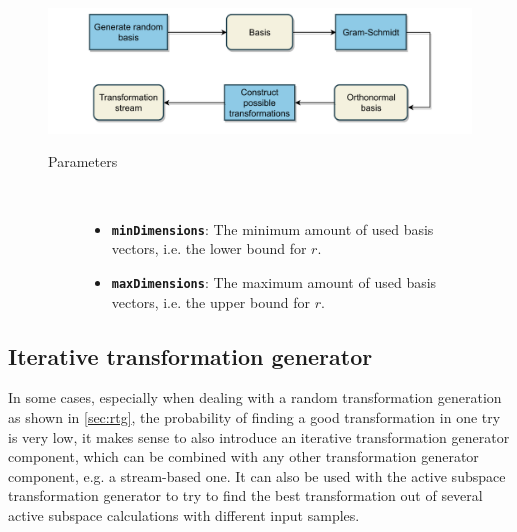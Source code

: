 \documentclass[
  a4paper,  %
  twoside,  %
  bibliography=totoc,
  headsepline,
  cleardoublepage=empty,
  parskip=half,
  draft=false
]{scrbook}
\begin{document}
\begin{mdframed}[style=style,frametitle={Transformation stream generator (random)}]
\begin{figure}[H]

\vspace{5px}
\includegraphics[width=\textwidth]{graphics/TransformationStreamGen_Random.pdf}

\delimit
\begin{description}
\item[Parameters] {~ \begin{itemize}[\indent{}]
\item \texttt{\textbf{minDimensions}}: The minimum amount of used basis vectors, i.e. the lower bound for $r$.
\item \texttt{\textbf{maxDimensions}}: The maximum amount of used basis vectors, i.e. the upper bound for $r$.
\end{itemize}}
\end{description}
\delimit
{}
\label{fig:rtsg}
\end{figure}
\end{mdframed}

\newpage

\subsection {Iterative transformation generator}

In some cases, especially when dealing with a random transformation generation as shown in \cref{sec:rtg}, the probability of finding a good transformation in one try is very low, it makes sense to also introduce an iterative transformation generator component, which can be combined with any other transformation generator component, e.g. a stream-based one.
It can also be used with the active subspace transformation generator to try to find the best transformation out of several active subspace calculations with different input samples.
\end{document}
